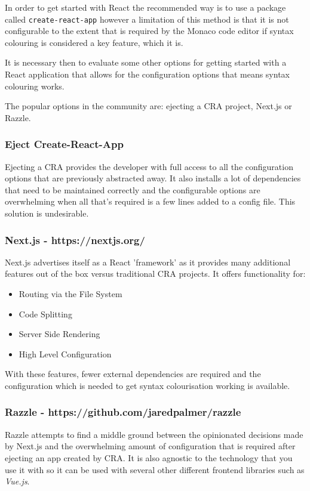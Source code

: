 In order to get started with React the recommended way is to use a package called \texttt{create-react-app} however a limitation of this method is that it is not configurable to the extent that is required by the Monaco code editor if syntax colouring is considered a key feature, which it is.

It is necessary then to evaluate some other options for getting started with a React application that allows for the configuration options that means syntax colouring works.

The popular options in the community are: ejecting a CRA project, Next.js or Razzle.

\subsubsection{Eject Create-React-App}
Ejecting a CRA provides the developer with full access to all the configuration options that are previously abstracted away. It also installs a lot of dependencies that need to be maintained correctly and the configurable options are overwhelming when all that's required is a few lines added to a config file. This solution is undesirable.

\subsubsection{Next.js - https://nextjs.org/}
Next.js advertises itself as a React 'framework' as it provides many additional features out of the box versus traditional CRA projects. It offers functionality for:

\begin{itemize}
  \item Routing via the File System
  \item Code Splitting
  \item Server Side Rendering
  \item High Level Configuration
\end{itemize}

With these features, fewer external dependencies are required and the configuration which is needed to get syntax colourisation working is available.

\subsubsection{Razzle - https://github.com/jaredpalmer/razzle}

Razzle attempts to find a middle ground between the opinionated decisions made by Next.js and the overwhelming amount of configuration that is required after ejecting an app created by CRA. It is also agnostic to the technology that you use it with so it can be used with several other different frontend libraries such as \textit{Vue.js}.

